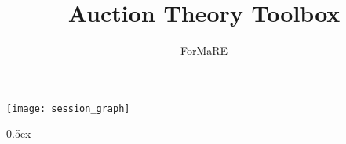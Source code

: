\documentclass[10pt,a4paper]{article}
\begin{document}
\title{Auction Theory Toolbox}
\author{ForMaRE}
\maketitle

\tableofcontents

\begin{center}
  \texttt{[image: session\_graph]}
\end{center}

\parindent 0pt\parskip 0.5ex



%
%
\end{document}
